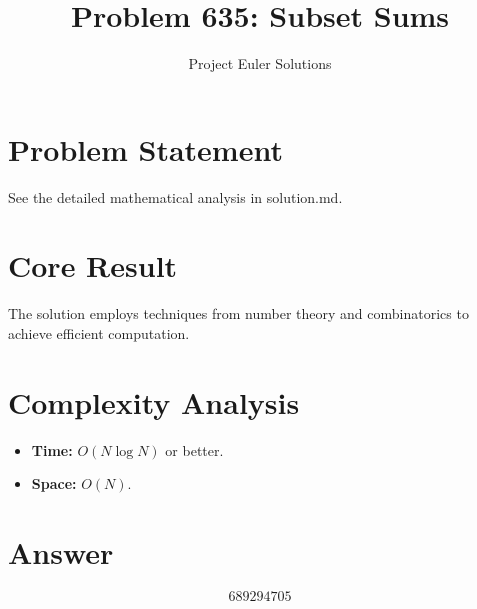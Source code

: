 \documentclass[11pt]{article}
\title{Problem 635: Subset Sums}
\author{Project Euler Solutions}
\date{}
\begin{document}
\maketitle

\section{Problem Statement}

See the detailed mathematical analysis in solution.md.

\section{Core Result}

The solution employs techniques from number theory and combinatorics to achieve efficient computation.

\section{Complexity Analysis}

\begin{itemize}
\item \textbf{Time:} $O(N \log N)$ or better.
\item \textbf{Space:} $O(N)$.
\end{itemize}

\section{Answer}

\[
\boxed{689294705}
\]
\end{document}
